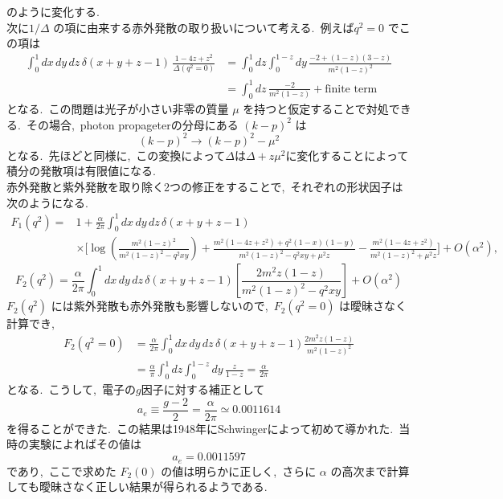 \documentclass[uplatex,dvipdfmx,a4paper,11pt]{jsarticle}
\begin{document}
のように変化する.\\
次に\(1/\Delta\) の項に由来する赤外発散の取り扱いについて考える.~例えば\(q^2=0\) でこの項は
\[
\begin{aligned}
\int_0^1 dx\,dy\,dz\,
\delta(x+y+z-1)\,
\frac{1-4z+z^2}{\Delta(q^2=0)}
&=
\int_0^1 dz\int_0^{1-z}dy\,
\frac{-2+(1-z)(3-z)}{m^2(1-z)^2}
\\
&=
\int_0^1 dz\,
\frac{-2}{m^2(1-z)}
+\text{finite term}
\end{aligned}
\]
となる.~この問題は光子が小さい非零の質量 \(\mu\) を持つと仮定することで対処できる.~その場合,~photon propageterの分母にある \((k-p)^2\) は
\[
(k-p)^2\to (k-p)^2-\mu^2
\]
となる.~先ほどと同様に,~この変換によって$\Delta$は$\Delta + z\mu^2$に変化することによって積分の発散項は有限値になる.\\
赤外発散と紫外発散を取り除く2つの修正をすることで,~それぞれの形状因子は次のようになる.
\[
\begin{aligned}
F_1(q^2)
={}&1+\frac{\alpha}{2\pi}
\int_0^1 dx\,dy\,dz\,\delta(x+y+z-1)
\\
&\times\Biggl[
\log\!\left(
\frac{m^2(1-z)^2}{m^2(1-z)^2-q^2xy}
\right)
+\frac{
m^2(1-4z+z^2)+q^2(1-x)(1-y)
}{
m^2(1-z)^2-q^2xy+\mu^2z
}
-\frac{m^2(1-4z+z^2)}
{m^2(1-z)^2+\mu^2z}
\Biggr]
+O(\alpha^2),
\end{aligned}
\tag{6.56}
\]
\[
F_2(q^2)
=
\frac{\alpha}{2\pi}
\int_0^1dx\,dy\,dz\,\delta(x+y+z-1)
\left[
\frac{2m^2z(1-z)}
{m^2(1-z)^2-q^2xy}
\right]
+O(\alpha^2)
\]
\(F_2(q^2)\) には紫外発散も赤外発散も影響しないので,~\(F_2(q^2=0)\) は曖昧さなく計算でき,
\[
\begin{aligned}
F_2(q^2=0)
&=
\frac{\alpha}{2\pi}
\int_0^1dx\,dy\,dz\,\delta(x+y+z-1)
\frac{2m^2z(1-z)}{m^2(1-z)^2}
\\
&=
\frac{\alpha}{\pi}
\int_0^1dz\int_0^{1-z}dy\,
\frac{z}{1-z}
=\frac{\alpha}{2\pi}
\end{aligned}
\]
となる.~こうして,~電子の$g$因子に対する補正として
\[
a_e\equiv\frac{g-2}{2}
=\frac{\alpha}{2\pi}
\simeq0.0011614
\]
を得ることができた.~この結果は1948年にSchwingerによって初めて導かれた.~当時の実験によればその値は
\[
a_e=0.0011597
\]
であり,~ここで求めた \(F_2(0)\) の値は明らかに正しく,~さらに \(\alpha\) の高次まで計算しても曖昧さなく正しい結果が得られるようである.
\end{document}
